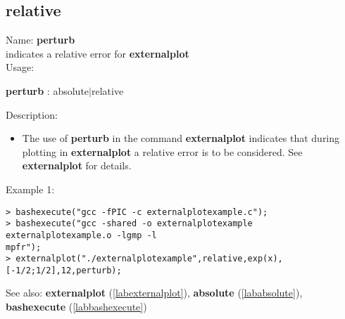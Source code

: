 \subsection{relative}
\label{labrelative}
\noindent Name: \textbf{perturb}\\
indicates a relative error for \textbf{externalplot}\\

\noindent Usage: 
\begin{center}
\textbf{perturb} : \textsf{absolute$|$relative}\\
\end{center}
\noindent Description: \begin{itemize}

\item The use of \textbf{perturb} in the command \textbf{externalplot} indicates that during
   plotting in \textbf{externalplot} a relative error is to be considered.
   See \textbf{externalplot} for details.
\end{itemize}
\noindent Example 1: 
\begin{center}\begin{minipage}{15cm}\begin{Verbatim}[frame=single]
> bashexecute("gcc -fPIC -c externalplotexample.c");
> bashexecute("gcc -shared -o externalplotexample externalplotexample.o -lgmp -l
mpfr");
> externalplot("./externalplotexample",relative,exp(x),[-1/2;1/2],12,perturb);
\end{Verbatim}
\end{minipage}\end{center}
See also: \textbf{externalplot} (\ref{labexternalplot}), \textbf{absolute} (\ref{lababsolute}), \textbf{bashexecute} (\ref{labbashexecute})
